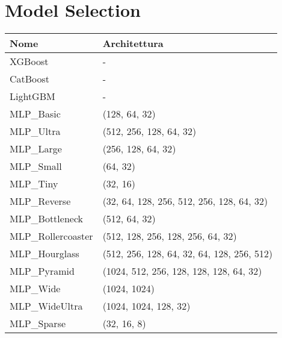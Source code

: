 \section{Model Selection}
\begin{table}[h!]
    \centering
    \begin{tabular}{|l|l|}
        \hline
        \textbf{Nome}           & \textbf{Architettura}                                 \\ \hline
        XGBoost                 & -                                                     \\ \hline
        CatBoost                & -                                                     \\ \hline
        LightGBM                & -                                                     \\ \hline
        MLP\_Basic              & (128, 64, 32)                                         \\ \hline
        MLP\_Ultra              & (512, 256, 128, 64, 32)                               \\ \hline
        MLP\_Large              & (256, 128, 64, 32)                                    \\ \hline
        MLP\_Small              & (64, 32)                                              \\ \hline
        MLP\_Tiny               & (32, 16)                                              \\ \hline
        MLP\_Reverse            & (32, 64, 128, 256, 512, 256, 128, 64, 32)             \\ \hline
        MLP\_Bottleneck         & (512, 64, 32)                                         \\ \hline
        MLP\_Rollercoaster      & (512, 128, 256, 128, 256, 64, 32)                     \\ \hline
        MLP\_Hourglass          & (512, 256, 128, 64, 32, 64, 128, 256, 512)            \\ \hline
        MLP\_Pyramid            & (1024, 512, 256, 128, 128, 128, 64, 32)               \\ \hline
        MLP\_Wide               & (1024, 1024)                                          \\ \hline
        MLP\_WideUltra          & (1024, 1024, 128, 32)                                 \\ \hline
        MLP\_Sparse             & (32, 16, 8)                                           \\ \hline

\end{tabular}
\end{table}
